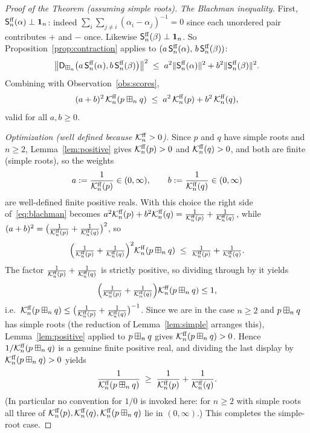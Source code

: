 \begin{proof}[Proof of the Theorem (assuming simple roots)]
\smallskip\noindent\textit{The Blachman inequality.}
First, $\mathsf{S}^{\mathrm{ff}}_n(\alpha)\perp\mathbf 1_n$: indeed
$\sum_i\sum_{j\ne i}(\alpha_i-\alpha_j)^{-1}=0$ since each unordered pair
contributes $+$ and $-$ once. Likewise $\mathsf{S}^{\mathrm{ff}}_n(\beta)\perp\mathbf 1_n$. So
Proposition~\ref{prop:contraction} applies to
$(a\,\mathsf{S}^{\mathrm{ff}}_n(\alpha),\,b\,\mathsf{S}^{\mathrm{ff}}_n(\beta))$:
\[
\bigl\|\mathsf{D}_{\boxplus_n}\bigl(a\,\mathsf{S}^{\mathrm{ff}}_n(\alpha),b\,\mathsf{S}^{\mathrm{ff}}_n(\beta)\bigr)\bigr\|^2
\;\le\;a^2\|\mathsf{S}^{\mathrm{ff}}_n(\alpha)\|^2+b^2\|\mathsf{S}^{\mathrm{ff}}_n(\beta)\|^2 .
\]
Combining with Observation~\ref{obs:scores},
\begin{equation}\label{eq:blachman}
(a+b)^2\,\mathcal{K}^{\mathrm{ff}}_n(p\boxplus_n q)\;\le\;a^2\,\mathcal{K}^{\mathrm{ff}}_n(p)+b^2\,\mathcal{K}^{\mathrm{ff}}_n(q),
\end{equation}
valid for all $a,b\ge0$.

\smallskip\noindent\textit{Optimization (well defined because $\mathcal{K}^{\mathrm{ff}}_n>0$).}
Since $p$ and $q$ have simple roots and $n\ge2$, Lemma~\ref{lem:positive} gives
$\mathcal{K}^{\mathrm{ff}}_n(p)>0$ and $\mathcal{K}^{\mathrm{ff}}_n(q)>0$, and both are finite (simple roots), so the
weights
\[
a:=\frac{1}{\mathcal{K}^{\mathrm{ff}}_n(p)}\in(0,\infty),\qquad b:=\frac{1}{\mathcal{K}^{\mathrm{ff}}_n(q)}\in(0,\infty)
\]
are well-defined finite positive reals. With this choice the right side
of~\eqref{eq:blachman} becomes
$a^2\mathcal{K}^{\mathrm{ff}}_n(p)+b^2\mathcal{K}^{\mathrm{ff}}_n(q)=\tfrac{1}{\mathcal{K}^{\mathrm{ff}}_n(p)}+\tfrac{1}{\mathcal{K}^{\mathrm{ff}}_n(q)}$,
while $(a+b)^2=\bigl(\tfrac{1}{\mathcal{K}^{\mathrm{ff}}_n(p)}+\tfrac{1}{\mathcal{K}^{\mathrm{ff}}_n(q)}\bigr)^2$, so
\[
\Bigl(\tfrac{1}{\mathcal{K}^{\mathrm{ff}}_n(p)}+\tfrac{1}{\mathcal{K}^{\mathrm{ff}}_n(q)}\Bigr)^2\mathcal{K}^{\mathrm{ff}}_n(p\boxplus_n q)
\;\le\;\tfrac{1}{\mathcal{K}^{\mathrm{ff}}_n(p)}+\tfrac{1}{\mathcal{K}^{\mathrm{ff}}_n(q)} .
\]
The factor $\tfrac{1}{\mathcal{K}^{\mathrm{ff}}_n(p)}+\tfrac{1}{\mathcal{K}^{\mathrm{ff}}_n(q)}$ is strictly positive,
so dividing through by it yields
\[
\Bigl(\tfrac{1}{\mathcal{K}^{\mathrm{ff}}_n(p)}+\tfrac{1}{\mathcal{K}^{\mathrm{ff}}_n(q)}\Bigr)\mathcal{K}^{\mathrm{ff}}_n(p\boxplus_n q)\le1,
\]
i.e.\ $\mathcal{K}^{\mathrm{ff}}_n(p\boxplus_n q)\le\bigl(\tfrac{1}{\mathcal{K}^{\mathrm{ff}}_n(p)}+\tfrac{1}{\mathcal{K}^{\mathrm{ff}}_n(q)}\bigr)^{-1}$.
Since we are in the case $n\ge2$ and $p\boxplus_n q$ has simple roots (the reduction
of Lemma~\ref{lem:simple} arranges this), Lemma~\ref{lem:positive} applied to
$p\boxplus_n q$ gives $\mathcal{K}^{\mathrm{ff}}_n(p\boxplus_n q)>0$. Hence $1/\mathcal{K}^{\mathrm{ff}}_n(p\boxplus_n q)$ is
a genuine finite positive real, and dividing the last display by
$\mathcal{K}^{\mathrm{ff}}_n(p\boxplus_n q)>0$ yields
\[
\frac{1}{\mathcal{K}^{\mathrm{ff}}_n(p\boxplus_n q)}\;\ge\;\frac{1}{\mathcal{K}^{\mathrm{ff}}_n(p)}+\frac{1}{\mathcal{K}^{\mathrm{ff}}_n(q)} .
\]
(In particular no convention for $1/0$ is invoked here: for $n\ge2$ with simple
roots all three of $\mathcal{K}^{\mathrm{ff}}_n(p),\mathcal{K}^{\mathrm{ff}}_n(q),\mathcal{K}^{\mathrm{ff}}_n(p\boxplus_n q)$ lie in
$(0,\infty)$.) This completes the simple-root case.
\end{proof}

